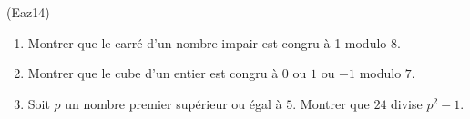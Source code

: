 \begin{tiny}(Eaz14)\end{tiny}
\begin{enumerate}
  \item Montrer que le carré d'un nombre impair est congru à 1 modulo 8.
  \item Montrer que le cube d'un entier est congru à $0$ ou $1$ ou $-1$ modulo $7$.
  \item Soit $p$ un nombre premier supérieur ou égal à $5$. Montrer que $24$ divise $p^2-1$. 
\end{enumerate}
